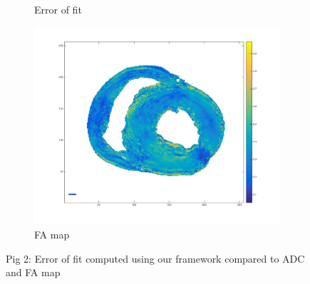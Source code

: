 \begin{figure}[h!]
\begin{subfigure}{.31\textwidth}
        \caption{Error of fit}
        \label{fig:pig2_err}
    \end{subfigure}
    \begin{subfigure}{.31\textwidth}
        \includegraphics[width=\textwidth]{figures/pig2_fa_31}
        \caption{FA map}
        \label{fig:pig2_fa}
    \end{subfigure}
    \caption{Pig 2: Error of fit computed using our framework compared to ADC and FA map}
    \label{fig:pig2}



\end{figure}
